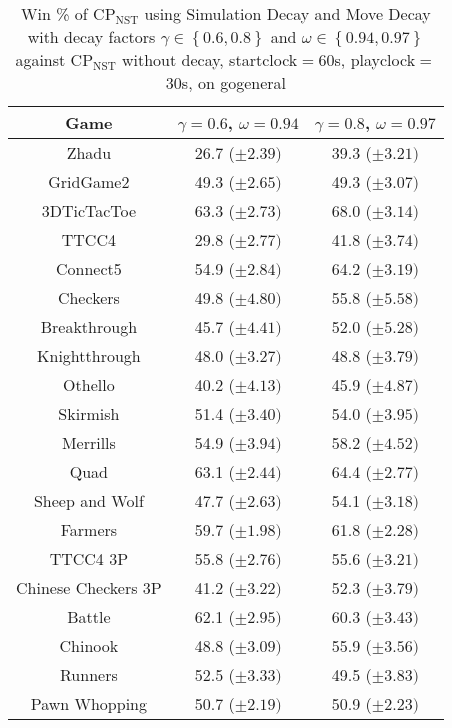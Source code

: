 \documentclass[journal]{IEEEtran}
\begin{document}
\begin{table}[h]
\caption{Win \% of CP$_{\textrm{NST}}$ using Simulation Decay and Move Decay with decay factors $\gamma \in \left\{ {0.6, 0.8}\right\}$ and $\omega \in \left\{ {0.94, 0.97}\right\}$ against CP$_{\textrm{NST}}$ without decay, startclock$=$60s, playclock$=$30s, on gogeneral}
\label{table:expSimulationDecayMoveDecayMixed}
\centering
\begin{tabular}{|c|c|c|}
\hline
 \textbf{Game} & $\gamma=0.6$, $\omega=0.94$ & $\gamma=0.8$, $\omega=0.97$  \\
\hline\hline
Zhadu & 26.7 ($\pm 2.39)$  & 39.3 ($\pm 3.21)$\\ 
GridGame2 & 49.3 ($\pm 2.65)$ & 49.3 ($\pm 3.07)$  \\ 
3DTicTacToe & 63.3 ($\pm 2.73)$ & 68.0 ($\pm 3.14)$  \\ 
TTCC4 & 29.8 ($\pm 2.77)$ & 41.8 ($\pm 3.74)$ \\ 
Connect5 & 54.9 ($\pm 2.84)$ & 64.2 ($\pm 3.19)$  \\ 
Checkers & 49.8 ($\pm 4.80)$ & 55.8 ($\pm 5.58)$   \\ 
Breakthrough & 45.7 ($\pm 4.41)$ & 52.0 ($\pm 5.28)$    \\ 
Knightthrough & 48.0 ($\pm 3.27)$ & 48.8 ($\pm 3.79)$    \\ 
Othello & 40.2 ($\pm 4.13)$ & 45.9 ($\pm 4.87)$   \\ 
Skirmish & 51.4 ($\pm 3.40)$ & 54.0 ($\pm 3.95)$  \\ 
Merrills & 54.9 ($\pm 3.94)$ & 58.2 ($\pm 4.52)$  \\ 
Quad & 63.1 ($\pm 2.44)$ & 64.4 ($\pm 2.77)$ \\ 
Sheep and Wolf & 47.7 ($\pm 2.63)$ & 54.1 ($\pm 3.18)$ \\ 
\hline
Farmers & 59.7 ($\pm 1.98)$ & 61.8 ($\pm 2.28)$ \\ 
TTCC4 3P & 55.8 ($\pm 2.76)$ & 55.6 ($\pm 3.21)$ \\ 
Chinese Checkers 3P & 41.2 ($\pm 3.22)$ & 52.3 ($\pm 3.79)$ \\ 
\hline
Battle & 62.1 ($\pm 2.95)$ & 60.3 ($\pm 3.43)$ \\ 
Chinook & 48.8 ($\pm 3.09)$ & 55.9 ($\pm 3.56)$   \\ 
Runners & 52.5 ($\pm 3.33)$ & 49.5 ($\pm 3.83)$ \\ 
Pawn Whopping & 50.7 ($\pm 2.19)$ & 50.9 ($\pm 2.23)$ \\ \hline
\end{tabular}
\end{table}
\end{document}
